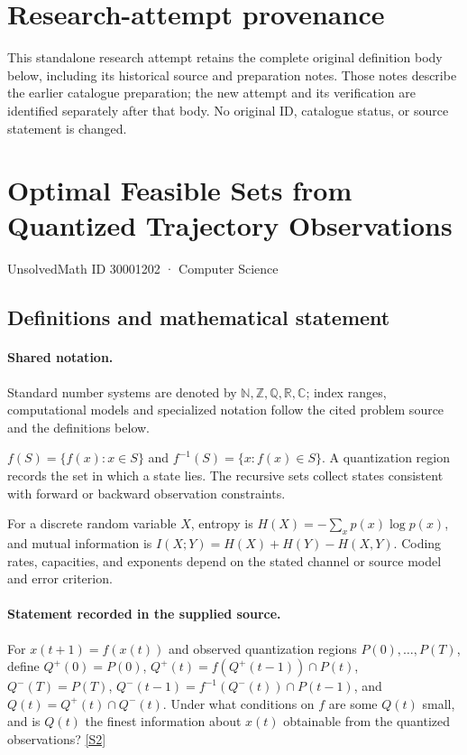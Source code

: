 \documentclass[11pt]{article}
\begin{document}
\section*{Research-attempt provenance}
This standalone research attempt retains the complete original definition body below,
including its historical source and preparation notes. Those notes describe the
earlier catalogue preparation; the new attempt and its verification are identified
separately after that body. No original ID, catalogue status, or source statement is changed.

\section{Optimal Feasible Sets from Quantized Trajectory Observations}\label{30001202}
{\small UnsolvedMath ID 30001202 · Computer Science}
\subsection{Definitions and mathematical statement}

\paragraph{Shared notation.}Standard number systems are denoted by $\mathbb N,\mathbb Z,\mathbb Q,\mathbb R,\mathbb C$; index ranges, computational models and specialized notation follow the cited problem source and the definitions below.


$f(S)=\{f(x):x\in S\}$ and $f^{-1}(S)=\{x:f(x)\in S\}$. A quantization region records the set in which a state lies. The recursive sets collect states consistent with forward or backward observation constraints.

For a discrete random variable $X$, entropy is $H(X)=-\sum_xp(x)\log p(x)$, and mutual information is $I(X;Y)=H(X)+H(Y)-H(X,Y)$. Coding rates, capacities, and exponents depend on the stated channel or source model and error criterion.
\paragraph{Statement recorded in the supplied source.}
For $x(t+1)=f(x(t))$ and observed quantization regions $P(0),\ldots,P(T)$, define $Q^+(0)=P(0)$, $Q^+(t)=f(Q^+(t-1))\cap P(t)$, $Q^-(T)=P(T)$, $Q^-(t-1)=f^{-1}(Q^-(t))\cap P(t-1)$, and $Q(t)=Q^+(t)\cap Q^-(t)$. Under what conditions on $f$ are some $Q(t)$ small, and is $Q(t)$ the finest information about $x(t)$ obtainable from the quantized observations? \href{https://doi.org/10.4171/owr/2009/11}{[S2]}
\end{document}
